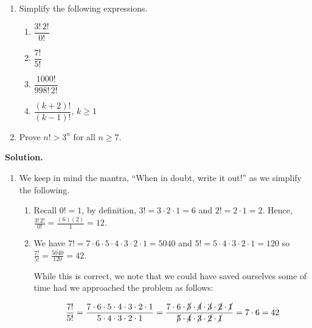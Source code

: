 \documentclass{ximera}
\begin{document}
\begin{ex}  \label{factorialex}  $~$

\begin{enumerate} 

\item  Simplify the following expressions.

\begin{multicols}{4}

\begin{enumerate}

\item  $\dfrac{3! \, 2!}{0!}$

\item  $\dfrac{7!}{5!}$

\item  $\dfrac{1000!}{998! \, 2!}$

\item  $\dfrac{(k+2)!}{(k-1)!}$, $k \geq 1$

\end{enumerate}

\end{multicols}

\item  Prove $n! > 3^n$ for all $n \geq 7$.

\end{enumerate}

{\bf Solution.}  

\begin{enumerate}

\item  We keep in mind the mantra, ``When in doubt, write it out!'' as we simplify the following.

\begin{enumerate}

\item  Recall $0! = 1$, by definition,  $3! = 3 \cdot 2 \cdot 1 = 6$ and $2! = 2 \cdot 1 = 2$. Hence, $\frac{3! \, 2!}{0!} = \frac{(6)(2)}{1} = 12$.

\item We have $7! = 7 \cdot 6 \cdot 5 \cdot 4 \cdot 3 \cdot 2 \cdot 1 = 5040$ and $5! = 5 \cdot 4 \cdot 3 \cdot 2 \cdot 1 = 120$ so $\frac{7!}{5!} = \frac{5040}{120} = 42$. 

\smallskip

While this is correct, we note that we could have saved ourselves some of time had we approached the problem as follows:

\[ \dfrac{7!}{5!} = \dfrac{7 \cdot 6 \cdot 5 \cdot 4 \cdot 3 \cdot 2 \cdot 1}{5 \cdot 4 \cdot 3 \cdot 2 \cdot 1} = \dfrac{7 \cdot 6 \cdot \cancel{5} \cdot \cancel{4} \cdot \cancel{3} \cdot \cancel{2} \cdot \cancel{1}}{\cancel{5} \cdot \cancel{4} \cdot \cancel{3} \cdot \cancel{2} \cdot \cancel{1}} = 7 \cdot 6 = 42\]


\end{enumerate}
\end{enumerate}
\end{ex}
\end{document}
